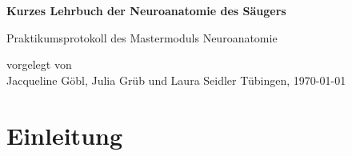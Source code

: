 \documentclass[12pt,a4paper,pdftex]{article}
\begin{document}
\setlength{\parindent}{0pt}


\begin{titlepage}
 \begin{center}
        \vspace*{1cm}
        \LARGE
        \textbf{Kurzes Lehrbuch der Neuroanatomie des Säugers}
        \vspace{2cm}
        
        \Large
        Praktikumsprotokoll des Mastermoduls Neuroanatomie
        \vspace{4cm}
        
        \large
        vorgelegt von \\ Jacqueline Göbl, Julia Grüb und Laura Seidler %
        \vfill
        \large     
        T\"ubingen, \today
    \end{center}
    \newpage
        \thispagestyle{empty}
        \mbox{}
        \newpage
\end{titlepage}


\thispagestyle{empty}
\mbox{}


\tableofcontents
\newpage
\listoffigures



\newpage
\section{Einleitung}
\end{document}

